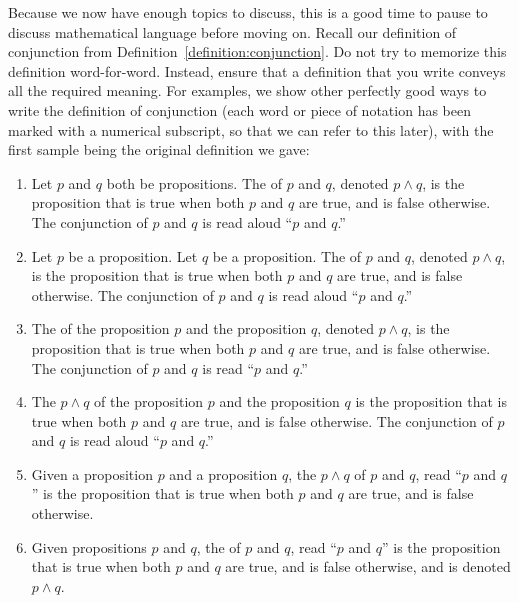 \documentclass{book}
\theoremstyle{ekimcustom}
\newcommand\defn[1]{{\color{blue}{\bf #1}}}
\begin{document}
Because we now have enough topics to discuss, this is a good time to pause to discuss mathematical language before moving on. Recall our definition of conjunction from Definition~\ref{definition:conjunction}. Do not try to memorize this definition word-for-word. Instead, ensure that a definition that you write conveys all the required meaning. For examples, we show other perfectly good ways to write the definition of conjunction (each word or piece of notation has been marked with a numerical subscript, so that we can refer to this later), with the first sample being the original definition we gave:
\begin{enumerate}
\item Let $p$ and $q$ both be propositions. The \defn{conjunction} of $p$ and $q$, denoted $p \wedge q$, is the proposition that is true when both $p$ and $q$ are true, and is false otherwise. The conjunction of $p$ and $q$ is read aloud ``$p$ and $q$.''

\item Let $p$ be a proposition. Let $q$ be a proposition. The \defn{conjunction} of $p$ and $q$, denoted $p \wedge q$, is the proposition that is true when both $p$ and $q$ are true, and is false otherwise. The conjunction of $p$ and $q$ is read aloud ``$p$ and $q$.''

\item The \defn{conjunction} of the proposition $p$ and the proposition $q$, denoted $p \wedge q$, is the proposition that is true when both $p$ and $q$ are true, and is false otherwise. The conjunction of $p$ and $q$ is read ``$p$ and $q$.''

\item The \defn{conjunction} $p \wedge q$ of the proposition $p$ and the proposition $q$ is the proposition that is true when both $p$ and $q$ are true, and is false otherwise. The conjunction of $p$ and $q$ is read aloud ``$p$ and $q$.''

\item Given a proposition $p$ and a proposition $q$, the \defn{conjunction} $p \wedge q$ of $p$ and $q$, read ``$p$ and $q$'' is the proposition that is true when both $p$ and $q$ are true, and is false otherwise.

\item Given propositions $p$ and $q$, the \defn{conjunction} of $p$ and $q$, read ``$p$ and $q$'' is the proposition that is true when both $p$ and $q$ are true, and is false otherwise, and is denoted $p \wedge q$.

\end{enumerate}
\end{document}
